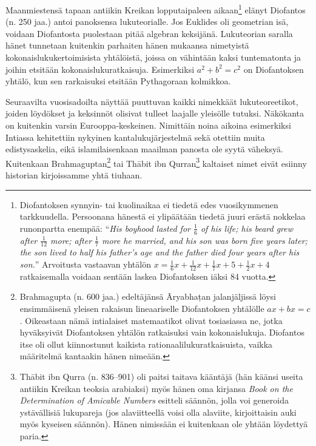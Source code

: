 \documentclass[a4paper,11pt]{article}
\begin{document}
Maanmiestensä tapaan antiikin Kreikan lopputaipaleen aikaan\footnote{Diofantoksen synnyin- tai kuolinaikaa ei tiedetä edes vuosikymmenen tarkkuudella. Persoonana hänestä ei ylipäätään tiedetä juuri erästä nokkelaa runonpartta enempää: \enquote{\textit{His boyhood lasted for $\frac{1}{6}$ of his life; his beard grew after $\frac{1}{12}$ more; after $\frac{1}{7}$ more he married, and his son was born five years later; the son lived to half his father’s age and the father died four years after his son.}}\cite{Burton}  Arvoitusta vastaavan yhtälön $x=\frac{1}{6}x+\frac{1}{12}x+\frac{1}{7}x+5+\frac{1}{2}x+4$ ratkaisemalla voidaan sentään laskea Diofantoksen iäksi 84 vuotta.} elänyt Diofantos (n. 250 jaa.) antoi panoksensa lukuteorialle. Jos Euklides oli geometrian isä, voidaan Diofantosta puolestaan pitää algebran keksijänä. Lukuteorian saralla hänet tunnetaan kuitenkin parhaiten hänen mukaansa nimetyistä kokonaislukukertoimisista yhtälöistä, joissa on vähintään kaksi tuntematonta ja joihin etsitään kokonaislukuratkaisuja. Esimerkiksi $a^2+b^2=c^2$ on Diofantoksen yhtälö, kun sen rarkaisuksi etsitään Pythagoraan kolmikkoa.

Seuraavilta vuosisadoilta näyttää puuttuvan kaikki nimekkäät lukuteoreetikot, joiden löydökset ja keksinnöt olisivat tulleet laajalle yleisölle tutuksi. Näkökanta on kuitenkin varsin Eurooppa-keskeinen. Nimittäin noina aikoina esimerkiksi Intiassa kehitettiin nykyinen kantalukujärjestelmä sekä otettiin muita edistysaskelia, eikä islamilaisenkaan maailman panosta ole syytä väheksyä. Kuitenkaan Brahmaguptan\footnote{Brahmagupta (n. 600 jaa.) edeltäjänsä Āryabhaṭan jalanjäljissä löysi ensimmäisenä yleisen rakaisun lineaariselle Diofantoksen yhtälölle $ax+bx=c$. Oikeastaan nämä intialaiset matemaatikot olivat tosiasiassa ne, jotka hyväksyivät Diofantoksen yhtälön ratkaisuksi vain kokonaislukuja. Diofantos itse oli ollut kiinnostunut kaikista rationaalilukuratkaisuista, vaikka määritelmä kantaakin hänen nimeään.\cite{Burton}} tai Thābit ibn Qurran\footnote{Thābit ibn
Qurra (n. 836–901) oli paitsi taitava kääntäjä (hän käänsi useita antiikin Kreikan teoksia arabiaksi) myös hänen oma kirjansa \textit{Book on the Determination of Amicable Numbers} esitteli säännön, jolla voi generoida ystävällisiä lukupareja (jos alaviitteellä voisi olla alaviite, kirjoittaisin auki myös kyseisen säännön). Hänen nimissään ei kuitenkaan ole yhtään löydettyä paria.} kaltaiset nimet eivät esiinny historian kirjoissamme yhtä tiuhaan.
\end{document}
